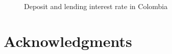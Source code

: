 \documentclass[
  ignorenonframetext,
]{beamer}
\begin{document}
\begin{frame}{}
\label{section-20}
\begin{figure}


\caption{\label{fig-deposit-lending-interest-rate-col}Deposit and
lending interest rate in Colombia}

\end{figure}%
\end{frame}

\section{Acknowledgments}\label{acknowledgments}
\end{document}
